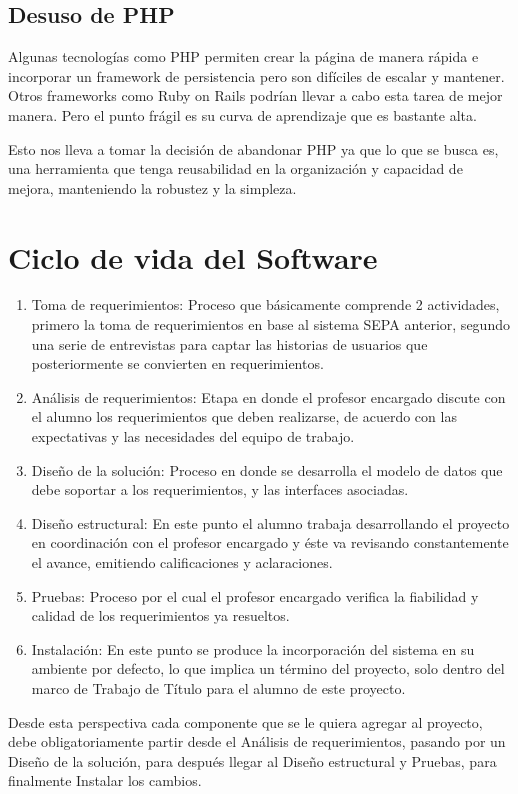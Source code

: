 \documentclass[a4paper,12pt,openany,oneside]{book}
\begin{document}
\subsection{Desuso de PHP}
Algunas tecnologías como PHP permiten crear la página de manera rápida e incorporar un framework de persistencia pero son difíciles de escalar y mantener.  Otros frameworks como Ruby on Rails podrían llevar a cabo esta tarea de mejor manera. Pero el punto frágil es su curva de aprendizaje que es bastante alta.

Esto nos lleva a tomar la decisión de abandonar PHP ya que lo que se busca es, una herramienta que tenga reusabilidad en la organización y capacidad de mejora, manteniendo la robustez y la simpleza.
\section{Ciclo de vida del Software}
\begin{enumerate}
\item Toma de requerimientos: Proceso que básicamente comprende 2 actividades, primero la toma de requerimientos en base al sistema SEPA anterior, segundo una serie de entrevistas para captar las historias de usuarios que posteriormente se convierten en requerimientos.
\item Análisis de requerimientos: Etapa en donde el profesor encargado discute con el alumno los requerimientos que deben realizarse, de acuerdo con las expectativas y las necesidades del equipo de trabajo.
\item Diseño de la solución: Proceso en donde se desarrolla el modelo de datos que debe soportar a los requerimientos, y las interfaces asociadas.
\item Diseño estructural: En este punto el alumno trabaja desarrollando el proyecto en coordinación con el profesor encargado y éste va revisando constantemente el avance, emitiendo calificaciones y aclaraciones.
\item Pruebas: Proceso por el cual el profesor encargado verifica la fiabilidad y calidad de los requerimientos ya resueltos.
\item Instalación: En este punto se produce la incorporación del sistema en su ambiente por defecto, lo que implica un término del proyecto, solo dentro del marco de Trabajo de Título para el alumno de este proyecto.
\end{enumerate}

Desde esta perspectiva cada componente que se le quiera agregar al proyecto, debe obligatoriamente partir desde el Análisis de requerimientos, pasando por un Diseño de la solución, para después llegar al Diseño estructural y Pruebas, para finalmente Instalar los cambios.
\end{document}
